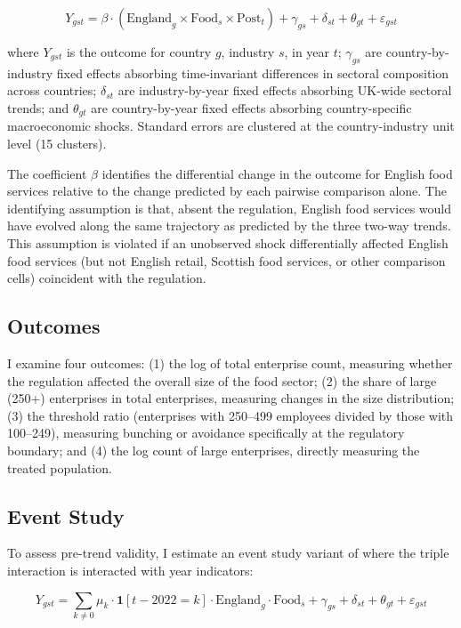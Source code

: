 \documentclass[12pt]{article}
\begin{document}
\begin{equation}
Y_{gst} = \beta \cdot (\text{England}_g \times \text{Food}_s \times \text{Post}_t) + \gamma_{gs} + \delta_{st} + \theta_{gt} + \varepsilon_{gst}
\label{eq:ddd}
\end{equation}

\noindent where $Y_{gst}$ is the outcome for country $g$, industry $s$, in year $t$; $\gamma_{gs}$ are country-by-industry fixed effects absorbing time-invariant differences in sectoral composition across countries; $\delta_{st}$ are industry-by-year fixed effects absorbing UK-wide sectoral trends; and $\theta_{gt}$ are country-by-year fixed effects absorbing country-specific macroeconomic shocks. Standard errors are clustered at the country-industry unit level (15 clusters).

The coefficient $\beta$ identifies the differential change in the outcome for English food services relative to the change predicted by each pairwise comparison alone. The identifying assumption is that, absent the regulation, English food services would have evolved along the same trajectory as predicted by the three two-way trends. This assumption is violated if an unobserved shock differentially affected English food services (but not English retail, Scottish food services, or other comparison cells) coincident with the regulation.

\subsection{Outcomes}

I examine four outcomes: (1) the log of total enterprise count, measuring whether the regulation affected the overall size of the food sector; (2) the share of large (250+) enterprises in total enterprises, measuring changes in the size distribution; (3) the threshold ratio (enterprises with 250--499 employees divided by those with 100--249), measuring bunching or avoidance specifically at the regulatory boundary; and (4) the log count of large enterprises, directly measuring the treated population.

\subsection{Event Study}

To assess pre-trend validity, I estimate an event study variant of  where the triple interaction is interacted with year indicators:

\begin{equation}
Y_{gst} = \sum_{k \neq 0} \mu_k \cdot \mathbf{1}[t - 2022 = k] \cdot \text{England}_g \cdot \text{Food}_s + \gamma_{gs} + \delta_{st} + \theta_{gt} + \varepsilon_{gst}
\end{equation}
\end{document}
